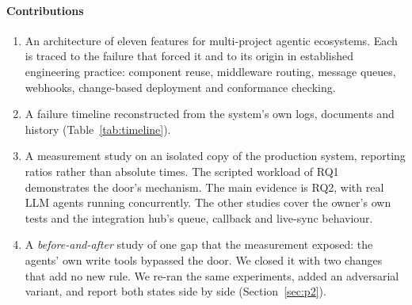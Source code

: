 \paragraph*{Contributions}
\begin{enumerate}
\item An architecture of eleven features for multi-project agentic ecosystems. Each is traced to the failure that forced it and to its origin in established engineering practice: component reuse, middleware routing, message queues, webhooks, change-based deployment and conformance checking.
\item A failure timeline reconstructed from the system's own logs, documents and history (Table~\ref{tab:timeline}).
\item A measurement study on an isolated copy of the production system, reporting ratios rather than absolute times. The scripted workload of RQ1 demonstrates the door's mechanism. The main evidence is RQ2, with real LLM agents running concurrently. The other studies cover the owner's own tests and the integration hub's queue, callback and live-sync behaviour.
\item A \emph{before-and-after} study of one gap that the measurement exposed: the agents' own write tools bypassed the door. We closed it with two changes that add no new rule. We re-ran the same experiments, added an adversarial variant, and report both states side by side (Section~\ref{sec:p2}).
\end{enumerate}

